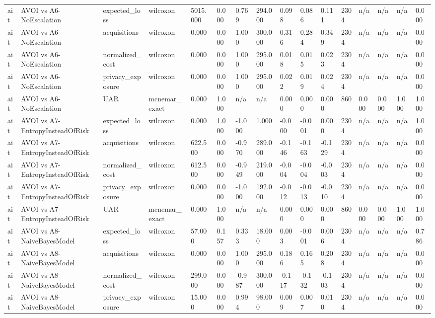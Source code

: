 \begin{table}[!ht]
{\begin{tabular}{llllllllllllllll}
ait & AVOI vs A6-NoEscalation & expected\_loss & wilcoxon & 5015.000 & 0.000 & 0.769 & 294.000 & 0.098 & 0.086 & 0.111 & 2304 & n/a & n/a & n/a & 0.000 \\
ait & AVOI vs A6-NoEscalation & acquisitions & wilcoxon & 0.000 & 0.000 & 1.000 & 300.000 & 0.316 & 0.284 & 0.349 & 2304 & n/a & n/a & n/a & 0.000 \\
ait & AVOI vs A6-NoEscalation & normalized\_cost & wilcoxon & 0.000 & 0.000 & 1.000 & 295.000 & 0.018 & 0.015 & 0.023 & 2304 & n/a & n/a & n/a & 0.000 \\
ait & AVOI vs A6-NoEscalation & privacy\_exposure & wilcoxon & 0.000 & 0.000 & 1.000 & 295.000 & 0.022 & 0.019 & 0.024 & 2304 & n/a & n/a & n/a & 0.000 \\
ait & AVOI vs A6-NoEscalation & UAR & mcnemar\_exact & 0.000 & 1.000 & n/a & n/a & 0.000 & 0.000 & 0.000 & 860 & 0.000 & 0.000 & 1.000 & 1.000 \\
ait & AVOI vs A7-EntropyInsteadOfRisk & expected\_loss & wilcoxon & 0.000 & 1.000 & -1.000 & 1.000 & -0.000 & -0.001 & 0.000 & 2304 & n/a & n/a & n/a & 1.000 \\
ait & AVOI vs A7-EntropyInsteadOfRisk & acquisitions & wilcoxon & 622.500 & 0.000 & -0.970 & 289.000 & -0.146 & -0.163 & -0.129 & 2304 & n/a & n/a & n/a & 0.000 \\
ait & AVOI vs A7-EntropyInsteadOfRisk & normalized\_cost & wilcoxon & 612.500 & 0.000 & -0.949 & 219.000 & -0.004 & -0.004 & -0.003 & 2304 & n/a & n/a & n/a & 0.000 \\
ait & AVOI vs A7-EntropyInsteadOfRisk & privacy\_exposure & wilcoxon & 0.000 & 0.000 & -1.000 & 192.000 & -0.012 & -0.013 & -0.010 & 2304 & n/a & n/a & n/a & 0.000 \\
ait & AVOI vs A7-EntropyInsteadOfRisk & UAR & mcnemar\_exact & 0.000 & 1.000 & n/a & n/a & 0.000 & 0.000 & 0.000 & 860 & 0.000 & 0.000 & 1.000 & 1.000 \\
ait & AVOI vs A8-NaiveBayesModel & expected\_loss & wilcoxon & 57.000 & 0.157 & 0.333 & 18.000 & 0.003 & -0.001 & 0.006 & 2304 & n/a & n/a & n/a & 0.786 \\
ait & AVOI vs A8-NaiveBayesModel & acquisitions & wilcoxon & 0.000 & 0.000 & 1.000 & 295.000 & 0.186 & 0.165 & 0.208 & 2304 & n/a & n/a & n/a & 0.000 \\
ait & AVOI vs A8-NaiveBayesModel & normalized\_cost & wilcoxon & 299.000 & 0.000 & -0.987 & 300.000 & -0.117 & -0.132 & -0.103 & 2304 & n/a & n/a & n/a & 0.000 \\
ait & AVOI vs A8-NaiveBayesModel & privacy\_exposure & wilcoxon & 15.000 & 0.000 & 0.994 & 98.000 & 0.009 & 0.007 & 0.010 & 2304 & n/a & n/a & n/a & 0.000 \\

\end{tabular}}
\end{table}
